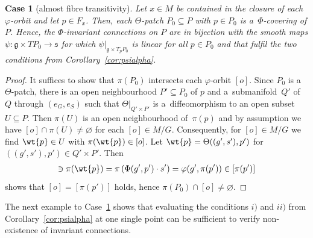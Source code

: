 \documentclass[pdftex]{sigma}
\numberwithin{equation}{section}
\newtheorem{scase}[Theorem]{Case}
{\theoremstyle{definition}
\newtheorem{Definition}[Theorem]{Definition}
\newtheorem{Convention}[Theorem]{Convention}
\newtheorem{Example}[Theorem]{Example}
\newtheorem{Remark}[Theorem]{Remark}
}
\begin{document}
\begin{scase}[almost f\/ibre transitivity]
\label{scase:slicegleichredcluster}
Let $x\in M$ be contained in the closure of each $\varphi$-orbit and let $p\in F_x$.
Then, each $\Theta$-patch $P_0\subseteq P$ with $p\in P_0$ is a~$\Phi$-covering of $P$.
Hence, the $\Phi$-invariant connections on $P$ are in bijection with the smooth maps $\psi\colon \mathfrak{g}\times
TP_0\rightarrow \mathfrak{s}$ for which $\psi|_{\mathfrak{g}\times T_pP_0}$ is linear for all $p\in P_0$ and that fulfil
the two conditions from Corollary~{\rm \ref{cor:psialpha}}.
\end{scase}

\begin{proof}
It suf\/f\/ices to show that $\pi\left(P_0\right)$ intersects each $\varphi$-orbit $[o]$.
Since $P_0$ is a~$\Theta$-patch, there is an open neighbourhood $P'\subseteq P_0$ of $p$ and a~submanifold~$ Q'$ of~$Q$
through $(e_G,e_S)$ such that $\Theta|_{Q' \times P'}$ is a~dif\/feomorphism to an open subset~$U\subseteq P$.
Then $\pi(U)$ is an open neighbourhood of~$\pi(p)$ and by assumption we have $[o]\cap \pi(U)\neq \varnothing$ for each
$[o]\in M\slash G$.
Consequently, for $[o]\in M\slash G$ we f\/ind $\wt{p}\in U$ with $\pi(\wt{p})\in [o]$.
Let $\wt{p}=\Theta((g',s'),p')$ for $((g',s'),p')\in Q'\times P'$.
Then
\begin{gather*}
[o]\ni\pi(\wt{p})=\pi\left(\Phi(g',p')\cdot s'\right)=\varphi(g',\pi(p'))\in [\pi(p')]
\end{gather*}
shows that $[o]=[\pi(p')]$ holds, hence $\pi\left(P_0\right)\cap [o]\neq \varnothing$.
\end{proof}

 The next example to Case~\ref{scase:slicegleichredcluster} shows that evaluating the conditions $i)$
and $ii)$ from Corollary~\ref{cor:psialpha} at one single point can be suf\/f\/icient to verify non-existence of
invariant connections.
\end{document}
